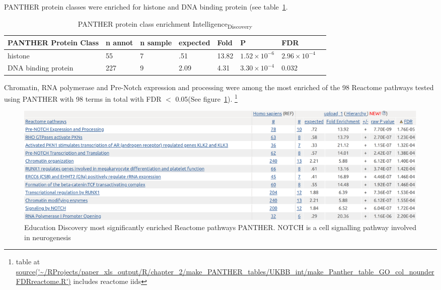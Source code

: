 PANTHER protein classes were enriched for histone and DNA binding protein (see table~\ref{tab:intelligence discovery panther protein class}.

\begin{table}[]
    \centering 
    \setlength{\extrarowheight}{2pt}
    \begin{tabular}{llllllll}
    \toprule
      PANTHER Protein Class &	n annot & n sample & 	expected& 	Fold &  P & 	FDR\\
      \midrule
histone &	55& 	7 &	.51& 	13.82 &	 $1.52 \times 10^{-6}$ &$2.96 \times 10^{-4}$\\
DNA binding protein &	227& 	9 &	2.09 &	4.31 &$3.30 \times 10^{-4}$ &	0.032     \\
         \bottomrule
    \end{tabular}
    \caption{PANTHER protein class enrichment Intelligence\textsubscript{Discovery}}
    \label{tab:intelligence discovery panther protein class}
\end{table}


 Chromatin, RNA polymerase and Pre-Notch expression and processing were among the most enriched of the 98 Reactome pathways tested using PANTHER with 98 terms in total with FDR $<$ 0.05(See figure~\ref{fig:UKBB int topp reac}).
\footnote{table at \url{source('~/RProjects/paper_xls_output/R/chapter_2/make_PANTHER_tables/UKBB_int/make_Panther_table_GO_col_nounderFDRreactome.R')} includes reactome iids}




\begin{figure}
    \centering
    \includegraphics[width=\textwidth]{images/chapter2/large_screenshots/int_discovery_large_reactome_panther3.png}
    \caption{Education Discovery most significantly enriched Reactome pathways PANTHER. NOTCH is a cell signalling pathway involved in neurogenesis}
    \label{fig:UKBB int topp reac}
\end{figure}

